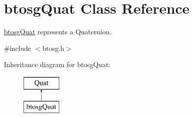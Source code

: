 \hypertarget{classbtosgQuat}{}\section{btosg\+Quat Class Reference}
\label{classbtosgQuat}


\mbox{\hyperlink{classbtosgQuat}{btosg\+Quat}} represents a Quaternion.  




{\ttfamily \#include $<$btosg.\+h$>$}

Inheritance diagram for btosg\+Quat\+:\begin{figure}[H]
\begin{center}
\leavevmode
\includegraphics[height=2.000000cm]{classbtosgQuat}
\end{center}
\end{figure}
